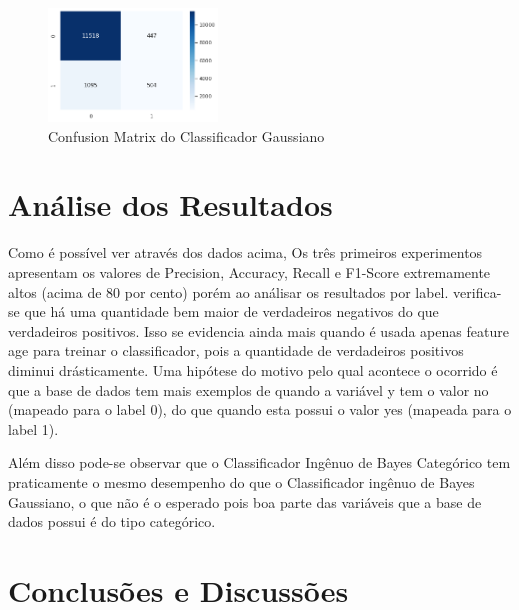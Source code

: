 \documentclass[conference]{IEEEtran}
\begin{document}
\begin{figure}[H]
    \centerline{\includegraphics[width=0.4\textwidth]{IMGS/cm-gnb-numeric.png}}
    \caption{\label{fig:cm3-gnb}Confusion Matrix do Classificador Gaussiano}
\end{figure}


\section{Análise dos Resultados}

Como é possível ver através dos dados acima, Os três primeiros experimentos apresentam os valores de Precision, Accuracy, Recall e F1-Score
extremamente altos (acima de 80 por cento) porém ao análisar os resultados por label. verifica-se que há uma quantidade bem maior de verdadeiros negativos do que verdadeiros positivos.
Isso se evidencia ainda mais quando é usada apenas feature age para treinar o classificador, pois a quantidade de verdadeiros positivos diminui drásticamente.
Uma hipótese do motivo pelo qual acontece o ocorrido é que a base de dados tem mais exemplos de quando a variável y tem o valor no (mapeado para o label 0),
do que quando esta possui o valor yes (mapeada para o label 1).

Além disso pode-se observar que o Classificador Ingênuo de Bayes Categórico tem praticamente o mesmo desempenho do que o Classificador ingênuo de Bayes Gaussiano, o que não é o esperado pois boa parte das variáveis que a base de dados possui é do tipo categórico.


\section{Conclusões e Discussões}





\nocite{*}

\end{document}
